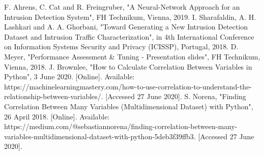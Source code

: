 \documentclass[conference]{IEEEtran}
\begin{document}
\begin{thebibliography}{00}
 F. Ahrens, C. Cat and R. Freingruber, "A Neural-Network Approach for an Intrusion Detection System", FH Technikum, Vienna, 2019.
 I. Sharafaldin, A. H. Lashkari and A. A. Ghorbani, "Toward Generating a New Intrusion Detection Dataset and Intrusion Traffic Characterization", in 4th International Conference on Information Systems Security and Privacy (ICISSP), Portugal, 2018.
 D. Meyer, "Performance Assessment \& Tuning - Presentation slides", FH Technikum, Vienna, 2018.
 J. Brownlee, "How to Calculate Correlation Between Variables in Python", 3 June 2020. [Online]. Available: https://machinelearningmastery.com/how-to-use-correlation-to-understand-the-relationship-between-variables/. [Accessed 27 June 2020].
 S. Norena, "Finding Correlation Between Many Variables (Multidimensional Dataset) with Python", 26 April 2018. [Online]. Available: https://medium.com/@sebastiannorena/finding-correlation-between-many-variables-multidimensional-dataset-with-python-5deb3f39ffb3. [Accessed 27 June 2020].
\end{thebibliography}
\end{document}
